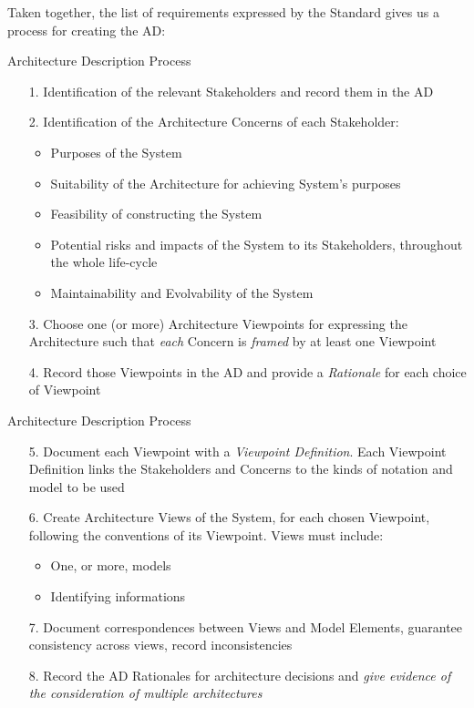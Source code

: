 		\begin{frame}
		Taken together, the list of requirements expressed by the Standard gives us a process for creating the AD:
			\begin{block}{Architecture Description Process}
			\begin{itemize}
				\item[1.] Identification of the relevant Stakeholders and record them in the AD
				\item[2.] Identification of the Architecture Concerns of each Stakeholder:
					\begin{itemize}
						\item Purposes of the System
						\item Suitability of the Architecture for achieving System's purposes
						\item Feasibility of constructing the System
						\item Potential risks and impacts of the System to its Stakeholders, throughout the whole life-cycle
						\item Maintainability and Evolvability of the System
					\end{itemize}
				\item[3.] Choose one (or more) Architecture Viewpoints for expressing the Architecture such that \emph{each} Concern is \emph{framed} by at least one Viewpoint
				\item[4.] Record those Viewpoints in the AD and provide a \emph{Rationale} for each choice of Viewpoint 
			\end{itemize}
			\end{block}
			
		\end{frame}
		
		\begin{frame}
			\begin{block}{Architecture Description Process}
				\begin{itemize}
					\item[5.] Document each Viewpoint with a \emph{Viewpoint Definition}. Each Viewpoint Definition links the Stakeholders and Concerns to the kinds of notation and model to be used
					\item[6.] Create Architecture Views of the System, for each chosen Viewpoint, following the conventions of its Viewpoint. Views must include:
						\begin{itemize}
							\item One, or more, models
							\item Identifying informations
						\end{itemize}
					\item[7.] Document correspondences between Views and Model Elements, guarantee consistency across views, record inconsistencies
					\item[8.] Record the AD Rationales for architecture decisions and \emph{give evidence of the consideration of multiple architectures}
				\end{itemize}
			\end{block}
		\end{frame}
		
